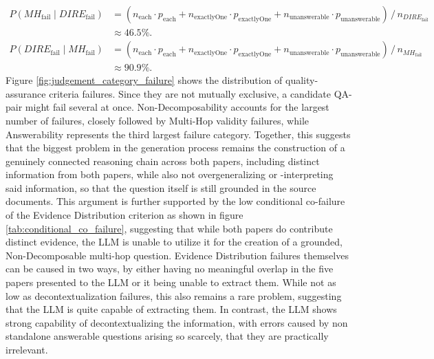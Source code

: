 \[
\begin{aligned}
P(MH_{\text{fail}} \mid DIRE_{\text{fail}})
&=
(n_{\text{each}} \cdot p_{\text{each}}
+ n_{\text{exactlyOne}} \cdot p_{\text{exactlyOne}}
+ n_{\text{unanswerable}} \cdot p_{\text{unanswerable}})
\,/\, n_{DIRE_{\text{fail}}} \\
&\approx 46.5\%.
\end{aligned}
\]
\[
\begin{aligned}
P(DIRE_{\text{fail}} \mid MH_{\text{fail}})
&=
(n_{\text{each}} \cdot p_{\text{each}}
+ n_{\text{exactlyOne}} \cdot p_{\text{exactlyOne}}
+ n_{\text{unanswerable}} \cdot p_{\text{unanswerable}})
\,/\, n_{MH_{\text{fail}}} \\
&\approx 90.9\%.
\end{aligned}
\]
Figure \ref{fig:judgement_category_failure} shows the distribution of quality-assurance criteria failures. Since they are not mutually exclusive, a candidate QA-pair might fail several at once. 
Non-Decomposability accounts for the largest number of failures, closely followed by Multi-Hop validity failures, while Answerability represents the third largest failure category. Together, this suggests that the biggest problem in the generation process remains the construction of a genuinely connected reasoning chain across both papers, including distinct information from both papers, while also not overgeneralizing or -interpreting said information, so that the question itself is still grounded in the source documents. This argument is further supported by the low conditional co-failure of the Evidence Distribution criterion as shown in figure \ref{tab:conditional_co_failure}, suggesting that while both papers do contribute distinct evidence, the LLM is unable to utilize it for the creation of a grounded, Non-Decomposable multi-hop question.
Evidence Distribution failures themselves can be caused in two ways, by either having no meaningful overlap in the five papers presented to the LLM or it being unable to extract them. While not as low as decontextualization failures, this also remains a rare problem, suggesting that the LLM is quite capable of extracting them.
In contrast, the LLM shows strong capability of decontextualizing the information, with errors caused by non standalone answerable questions arising so scarcely, that they are practically irrelevant.

